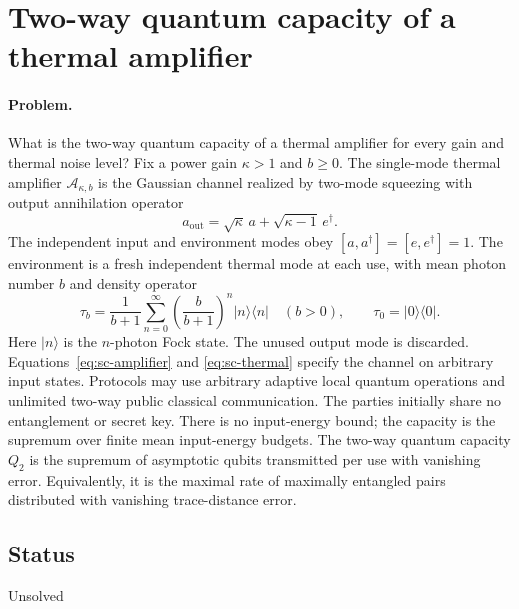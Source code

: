 \section{Two-way quantum capacity of a thermal amplifier}
\label{sec:op_709c2048154de463}

\paragraph{Problem.}
What is the two-way quantum capacity of a thermal amplifier for every gain and thermal noise level?
Fix a power gain $\kappa>1$ and $b\geq0$. The single-mode thermal amplifier $\mathcal A_{\kappa,b}$ is the Gaussian channel realized by two-mode squeezing with output annihilation operator
\begin{equation}
 a_{\mathrm{out}}=\sqrt\kappa\,a+\sqrt{\kappa-1}\,e^\dagger.
 \label{eq:sc-amplifier}
\end{equation}
The independent input and environment modes obey $[a,a^\dagger]=[e,e^\dagger]=1$. The environment is a fresh independent thermal mode at each use, with mean photon number $b$ and density operator
\begin{equation}
 \tau_b=\frac1{b+1}\sum_{n=0}^{\infty}\left(\frac b{b+1}\right)^n|n\rangle\langle n|\quad(b>0),\qquad \tau_0=|0\rangle\langle0|.
 \label{eq:sc-thermal}
\end{equation}
Here $|n\rangle$ is the $n$-photon Fock state. The unused output mode is discarded.
Equations~\eqref{eq:sc-amplifier} and \eqref{eq:sc-thermal} specify the channel on arbitrary input states.
Protocols may use arbitrary adaptive local quantum operations and unlimited two-way public classical communication. The parties initially share no entanglement or secret key. There is no input-energy bound; the capacity is the supremum over finite mean input-energy budgets.
The two-way quantum capacity $Q_2$ is the supremum of asymptotic qubits transmitted per use with vanishing error. Equivalently, it is the maximal rate of maximally entangled pairs distributed with vanishing trace-distance error.

\subsection*{Status}

Unsolved

